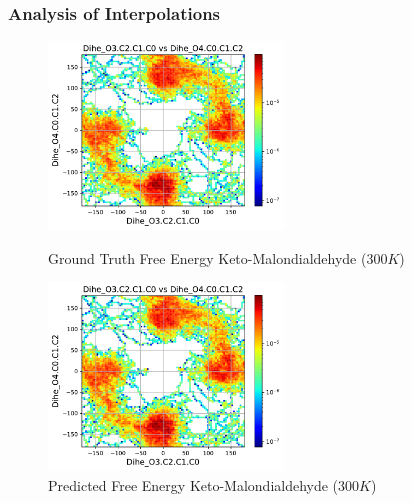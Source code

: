 \documentclass[usenames, dvipsnames, t]{beamer}
\begin{document}
\begin{frame}
	\frametitle{Analysis of Interpolations}
	\begin{figure}[htb]
		\begin{minipage}{0.49\textwidth}
			\includegraphics[width=0.9\linewidth, height=5cm]{KETO-MDA_300K_GroundTruth.pdf} 
			\caption{Ground Truth Free Energy Keto-Malondialdehyde ($300K$)}
		\end{minipage}
		\begin{minipage}{0.49\textwidth}
			\includegraphics[width=0.9\linewidth, height=5cm]{KETO-MDA_300K_ML.pdf}
			\caption{Predicted Free Energy Keto-Malondialdehyde ($300K$)}
		\end{minipage}
	\end{figure}
\end{frame}
\end{document}

